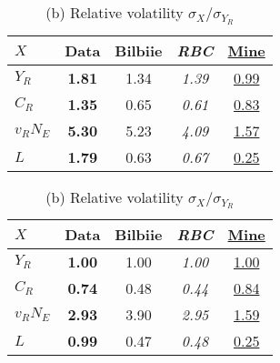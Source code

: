 \documentclass[a4paper,12pt]{article} %
\numberwithin{equation}{section} %
\numberwithin{figure}{section}
\numberwithin{table}{section}
\newcommand{\dat}{\textbf}      %
\newcommand{\rbc}{\emph}        %
\newcommand{\mine}[1]{\underline{#1}}   %
\begin{document}
\begin{refsection}
\begin{appendices}
\begin{table}[htbp]
\centering
\label{tab:moments}
\begin{subtable}[t]{.48\textwidth}
  \centering
  \caption*{(a) Volatility $\sigma_X$}
  \begin{tabular}{lcccc}
  \toprule
   $X$ & \dat{Data} & Bilbiie & \rbc{RBC} & \mine{Mine}\\
  \midrule
   $Y_R$      & \dat{1.81} & 1.34 & \rbc{1.39} & \mine{0.99}\\
   $C_R$      & \dat{1.35} & 0.65 & \rbc{0.61} & \mine{0.83}\\
   $v_RN_E$   & \dat{5.30} & 5.23 & \rbc{4.09} & \mine{1.57}\\
   $L$        & \dat{1.79} & 0.63 & \rbc{0.67} & \mine{0.25}\\
  \bottomrule
  \end{tabular}
\end{subtable}
\hfill
\begin{subtable}[t]{.48\textwidth}
  \centering
  \caption*{(b) Relative volatility $\sigma_X/\sigma_{Y_R}$}
  \begin{tabular}{lcccc}
  \toprule
   $X$ & \dat{Data} & Bilbiie & \rbc{RBC} & \mine{Mine}\\
  \midrule
   $Y_R$      & \dat{1.00} & 1.00 & \rbc{1.00} & \mine{1.00}\\
   $C_R$      & \dat{0.74} & 0.48 & \rbc{0.44} & \mine{0.84}\\
   $v_RN_E$   & \dat{2.93} & 3.90 & \rbc{2.95} & \mine{1.59}\\
   $L$        & \dat{0.99} & 0.47 & \rbc{0.48} & \mine{0.25}\\
  \bottomrule
  \end{tabular}
\end{subtable}

\vspace{0.8em}   %


\end{table}
\end{appendices}
\end{refsection}
\end{document}
